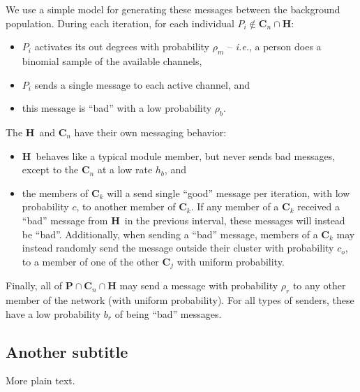 \documentclass{article}
\newcommand{\Hub}[0]{\ensuremath{\mathbf{H}}}
\newcommand{\C}[1]{\ensuremath{\mathbf{C}_{#1}}}
\begin{document}
We use a simple model for generating these messages between the background population.  During each iteration, for each individual $P_i\notin\C{n}\cap\Hub$:
\begin{itemize}
\item $P_i$ activates its out degrees with probability $\rho_m$ -- {\em i.e.}, a person does a binomial sample of the available channels,
\item $P_i$ sends a single message to each active channel, and
\item this message is ``bad'' with a low probability $\rho_b$. 
\end{itemize}
%
The \Hub\ and \C{n} have their own messaging behavior:
%
\begin{itemize}
\item \Hub\ behaves like a typical module member, but never sends bad messages, except to the \C{n} at a low rate $h_b$, and
\item the members of \C{k} will a send single ``good'' message per iteration, with low probability $c$, to another member of \C{k}.  If any member of a \C{k} received a ``bad'' message from \Hub\ in the previous interval, these messages will instead be ``bad''.  Additionally, when sending a ``bad'' message, members of a \C{k} may instead randomly send the message outside their cluster with probability $c_o$, to a member of one of the other \C{j} with uniform probability.
\end{itemize}

Finally, all of $\mathbf{P}\cap\C{n}\cap\Hub$ may send a message with probability $\rho_r$ to any other member of the network (with uniform probability).  For all types of senders, these have a low probability $b_r$ of being ``bad'' messages.

\subsection{Another subtitle}

More plain text.

\newpage


\end{document}
